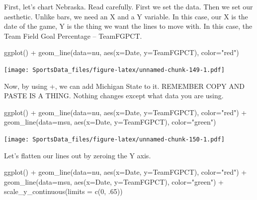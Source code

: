 \documentclass[
]{book}
\newenvironment{Shaded}{\begin{snugshade}}{\end{snugshade}}
\newcommand{\AttributeTok}[1]{\textcolor[rgb]{0.77,0.63,0.00}{#1}}
\newcommand{\DecValTok}[1]{\textcolor[rgb]{0.00,0.00,0.81}{#1}}
\newcommand{\FunctionTok}[1]{\textcolor[rgb]{0.00,0.00,0.00}{#1}}
\newcommand{\NormalTok}[1]{#1}
\newcommand{\SpecialCharTok}[1]{\textcolor[rgb]{0.00,0.00,0.00}{#1}}
\newcommand{\StringTok}[1]{\textcolor[rgb]{0.31,0.60,0.02}{#1}}
\begin{document}
First, let's chart Nebraska. Read carefully. First we set the data. Then we set our aesthetic. Unlike bars, we need an X and a Y variable. In this case, our X is the date of the game, Y is the thing we want the lines to move with. In this case, the Team Field Goal Percentage -- TeamFGPCT.

\begin{Shaded}
\begin{Highlighting}[]
\FunctionTok{ggplot}\NormalTok{() }\SpecialCharTok{+} \FunctionTok{geom\_line}\NormalTok{(}\AttributeTok{data=}\NormalTok{nu, }\FunctionTok{aes}\NormalTok{(}\AttributeTok{x=}\NormalTok{Date, }\AttributeTok{y=}\NormalTok{TeamFGPCT), }\AttributeTok{color=}\StringTok{"red"}\NormalTok{)}
\end{Highlighting}
\end{Shaded}

\texttt{[image: SportsData\_files/figure-latex/unnamed-chunk-149-1.pdf]}

Now, by using +, we can add Michigan State to it. REMEMBER COPY AND PASTE IS A THING. Nothing changes except what data you are using.

\begin{Shaded}
\begin{Highlighting}[]
\FunctionTok{ggplot}\NormalTok{() }\SpecialCharTok{+} \FunctionTok{geom\_line}\NormalTok{(}\AttributeTok{data=}\NormalTok{nu, }\FunctionTok{aes}\NormalTok{(}\AttributeTok{x=}\NormalTok{Date, }\AttributeTok{y=}\NormalTok{TeamFGPCT), }\AttributeTok{color=}\StringTok{"red"}\NormalTok{) }\SpecialCharTok{+} \FunctionTok{geom\_line}\NormalTok{(}\AttributeTok{data=}\NormalTok{msu, }\FunctionTok{aes}\NormalTok{(}\AttributeTok{x=}\NormalTok{Date, }\AttributeTok{y=}\NormalTok{TeamFGPCT), }\AttributeTok{color=}\StringTok{"green"}\NormalTok{)}
\end{Highlighting}
\end{Shaded}

\texttt{[image: SportsData\_files/figure-latex/unnamed-chunk-150-1.pdf]}

Let's flatten our lines out by zeroing the Y axis.

\begin{Shaded}
\begin{Highlighting}[]
\FunctionTok{ggplot}\NormalTok{() }\SpecialCharTok{+} \FunctionTok{geom\_line}\NormalTok{(}\AttributeTok{data=}\NormalTok{nu, }\FunctionTok{aes}\NormalTok{(}\AttributeTok{x=}\NormalTok{Date, }\AttributeTok{y=}\NormalTok{TeamFGPCT), }\AttributeTok{color=}\StringTok{"red"}\NormalTok{) }\SpecialCharTok{+} \FunctionTok{geom\_line}\NormalTok{(}\AttributeTok{data=}\NormalTok{msu, }\FunctionTok{aes}\NormalTok{(}\AttributeTok{x=}\NormalTok{Date, }\AttributeTok{y=}\NormalTok{TeamFGPCT), }\AttributeTok{color=}\StringTok{"green"}\NormalTok{) }\SpecialCharTok{+} \FunctionTok{scale\_y\_continuous}\NormalTok{(}\AttributeTok{limits =} \FunctionTok{c}\NormalTok{(}\DecValTok{0}\NormalTok{, .}\DecValTok{65}\NormalTok{))}
\end{Highlighting}
\end{Shaded}
\end{document}
